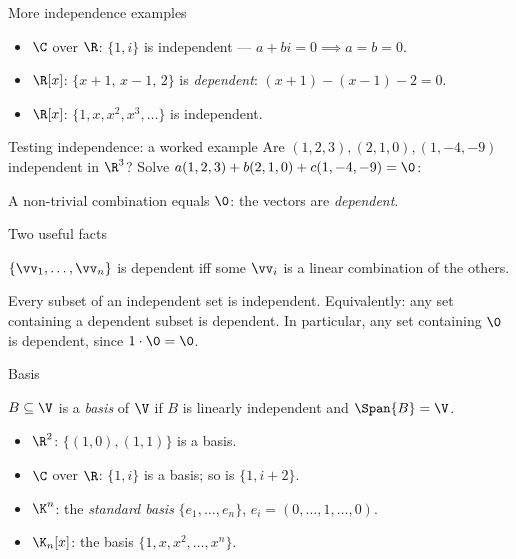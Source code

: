 \begin{frame}{More independence examples}
\begin{itemize}
\item $\C$ over $\R$: $\{1,i\}$ is independent — $a+bi=0\implies a=b=0$.
\pause
\item $\R[x]$: $\{x+1,\,x-1,\,2\}$ is \emph{dependent}: $(x+1)-(x-1)-2=0$.
\pause
\item $\R[x]$: $\{1,x,x^2,x^3,\ldots\}$ is independent.
\end{itemize}
\end{frame}

\begin{frame}{Testing independence: a worked example}
Are $(1,2,3),(2,1,0),(1,-4,-9)$ independent in $\R^3$? Solve $a(1,2,3)+b(2,1,0)+c(1,-4,-9)=\0$:

\pause

\begin{steps}
\end{steps}

\pause

A non-trivial combination equals $\0$: the vectors are \emph{dependent}.
\end{frame}

\begin{frame}{Two useful facts}
\begin{fact}
$\{\vv_1,\ldots,\vv_n\}$ is dependent iff some $\vv_i$ is a linear combination of the others.
\end{fact}

\pause

\begin{fact}
Every subset of an independent set is independent. Equivalently: any set containing a dependent subset is
dependent. In particular, any set containing $\0$ is dependent, since $1\cdot\0=\0$.
\end{fact}
\end{frame}

\begin{frame}{Basis}
\begin{definition}
$B\subseteq\V$ is a \emph{basis} of $\V$ if $B$ is linearly independent and $\Span{B}=\V$.
\end{definition}

\pause

\begin{itemize}
\item $\R^2$: $\{(1,0),(1,1)\}$ is a basis.
\pause
\item $\C$ over $\R$: $\{1,i\}$ is a basis; so is $\{1,i+2\}$.
\pause
\item $\K^n$: the \emph{standard basis} $\{e_1,\ldots,e_n\}$, $e_i=(0,\ldots,1,\ldots,0)$.
\pause
\item $\K_n[x]$: the basis $\{1,x,x^2,\ldots,x^n\}$.
\end{itemize}
\end{frame}

